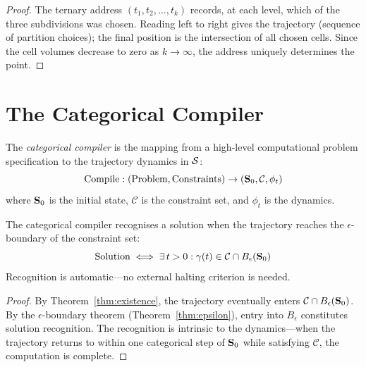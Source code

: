 \begin{proof}
The ternary address $(t_1, t_2, \ldots, t_k)$ records, at each level, which of the three subdivisions was chosen. Reading left to right gives the trajectory (sequence of partition choices); the final position is the intersection of all chosen cells. Since the cell volumes decrease to zero as $k \to \infty$, the address uniquely determines the point.
\end{proof}

\section{The Categorical Compiler}
\label{sec:compiler}

\begin{definition}
\label{def:compiler}
The \emph{categorical compiler} is the mapping from a high-level computational problem specification to the trajectory dynamics in $\mathcal{S}$:
\begin{equation}
    \mathrm{Compile} : (\text{Problem}, \text{Constraints}) \to (\mathbf{S}_0, \mathcal{C}, \phi_t)
\end{equation}
where $\mathbf{S}_0$ is the initial state, $\mathcal{C}$ is the constraint set, and $\phi_t$ is the dynamics.
\end{definition}

\begin{theorem}
\label{thm:recognition}
The categorical compiler recognises a solution when the trajectory reaches the $\epsilon$-boundary of the constraint set:
\begin{equation}
    \text{Solution} \iff \exists\, t > 0 : \gamma(t) \in \mathcal{C} \cap B_\epsilon(\mathbf{S}_0)
\end{equation}
Recognition is automatic---no external halting criterion is needed.
\end{theorem}

\begin{proof}
By Theorem~\ref{thm:existence}, the trajectory eventually enters $\mathcal{C} \cap B_\epsilon(\mathbf{S}_0)$. By the $\epsilon$-boundary theorem (Theorem~\ref{thm:epsilon}), entry into $B_\epsilon$ constitutes solution recognition. The recognition is intrinsic to the dynamics---when the trajectory returns to within one categorical step of $\mathbf{S}_0$ while satisfying $\mathcal{C}$, the computation is complete.
\end{proof}

